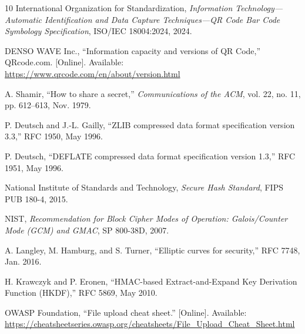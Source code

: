 \documentclass[conference]{IEEEtran}
\begin{document}
\begin{thebibliography}{10}
International Organization for Standardization, \emph{Information Technology---Automatic Identification and Data Capture Techniques---QR Code Bar Code Symbology Specification}, ISO/IEC 18004:2024, 2024.

DENSO WAVE Inc., ``Information capacity and versions of QR Code,'' QRcode.com. [Online]. Available: \url{https://www.qrcode.com/en/about/version.html}

A. Shamir, ``How to share a secret,'' \emph{Communications of the ACM}, vol. 22, no. 11, pp. 612--613, Nov. 1979.

P. Deutsch and J.-L. Gailly, ``ZLIB compressed data format specification version 3.3,'' RFC 1950, May 1996.

P. Deutsch, ``DEFLATE compressed data format specification version 1.3,'' RFC 1951, May 1996.

National Institute of Standards and Technology, \emph{Secure Hash Standard}, FIPS PUB 180-4, 2015.

NIST, \emph{Recommendation for Block Cipher Modes of Operation: Galois/Counter Mode (GCM) and GMAC}, SP 800-38D, 2007.

A. Langley, M. Hamburg, and S. Turner, ``Elliptic curves for security,'' RFC 7748, Jan. 2016.

H. Krawczyk and P. Eronen, ``HMAC-based Extract-and-Expand Key Derivation Function (HKDF),'' RFC 5869, May 2010.

OWASP Foundation, ``File upload cheat sheet.'' [Online]. Available: \url{https://cheatsheetseries.owasp.org/cheatsheets/File_Upload_Cheat_Sheet.html}
\end{thebibliography}
\end{document}
